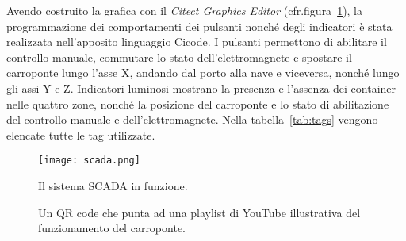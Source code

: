 Avendo costruito la grafica con il \emph{Citect Graphics Editor} (cfr.\@ figura~\ref{fig:scada}), la
programmazione dei comportamenti dei pulsanti nonché degli indicatori è stata realizzata
nell'apposito linguaggio Cicode. I pulsanti permettono di abilitare il controllo manuale, commutare
lo stato dell'elettromagnete e spostare il carroponte lungo l'asse X, andando dal porto alla nave e
viceversa, nonché lungo gli assi Y e Z. Indicatori luminosi mostrano la presenza e l'assenza dei
container nelle quattro zone, nonché la posizione del carroponte e lo stato di abilitazione del
controllo manuale e dell'elettromagnete. Nella tabella~\ref{tab:tags} vengono elencate tutte le tag
utilizzate.

\begin{figure}[htbp]\centering
    \caption{Il sistema SCADA in funzione.}\label{fig:scada}
    \texttt{[image: scada.png]}
\end{figure}

\begin{figure}[htbp]\centering
    \caption{Un QR code che punta ad una playlist di YouTube illustrativa del funzionamento del carroponte.}\label{fig:qrcode}
\end{figure}

